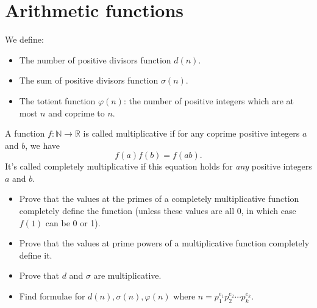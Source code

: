 \documentclass{article}
\begin{document}
\section{Arithmetic functions}
We define:
\begin{itemize}
	\item The number of positive divisors function $d(n)$.
	\item The sum of positive divisors function $\sigma(n)$.
	\item The totient function $\varphi(n)$: the number of positive integers
	      which are at most $n$ and coprime to $n$.
\end{itemize}
A function $f:\mathbb N\to\mathbb R$ is called multiplicative if for any
coprime positive integers $a$ and $b$, we have
\[f(a)f(b)=f(ab).\]
It's called completely multiplicative if this equation holds for \emph{any}
positive integers $a$ and $b$.
\begin{itemize}
	\item Prove that the values at the primes of a completely multiplicative
	      function completely define the function (unless these values are all 0, in
	      which case $f(1)$ can be 0 or 1).
	\item Prove that the values at prime powers of a multiplicative function
	      completely define it.
	\item Prove that $d$ and $\sigma$ are multiplicative.
	\item
	      Find formulae for $d(n),\sigma(n),\varphi(n)$ where
	      $n=p_1^{e_1}p_2^{e_2}\cdots p_k^{e_k}$.
\end{itemize}
\end{document}
